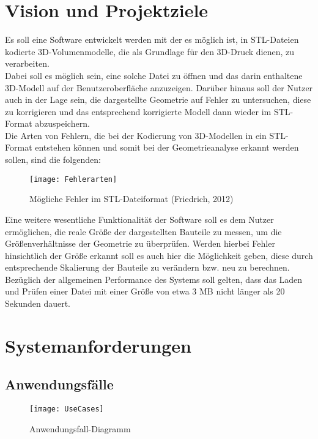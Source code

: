 \documentclass[fontsize=10pt, listof = totoc]{scrartcl}
\begin{document}
\section{Vision und Projektziele}
Es soll eine Software entwickelt werden mit der es möglich ist, in STL-Dateien kodierte 3D-Volumenmodelle, die als Grundlage für den 3D-Druck dienen, zu verarbeiten.\\

Dabei soll es möglich sein, eine solche Datei zu öffnen und das darin enthaltene 3D-Modell auf der Benutzeroberfläche anzuzeigen. Darüber hinaus soll der Nutzer auch in der Lage sein, die dargestellte Geometrie auf Fehler zu untersuchen, diese zu korrigieren und das entsprechend korrigierte Modell dann wieder im STL-Format abzuspeichern.\\

Die Arten von Fehlern, die bei der Kodierung von 3D-Modellen in ein STL-Format entstehen können und somit bei der Geometrieanalyse erkannt werden sollen, sind  die folgenden:

\begin{figure}[htpb]
\centering
\texttt{[image: Fehlerarten]}
\caption{Mögliche Fehler im STL-Dateiformat (Friedrich, 2012)}
\end{figure}

Eine weitere wesentliche Funktionalität der Software soll es dem Nutzer ermöglichen, die reale Größe der dargestellten Bauteile zu messen, um die Größenverhältnisse der Geometrie zu überprüfen. Werden hierbei Fehler hinsichtlich der Größe erkannt soll es auch hier die Möglichkeit geben, diese durch entsprechende Skalierung der Bauteile zu verändern bzw. neu zu berechnen.\\

Bezüglich der allgemeinen Performance des Systems soll gelten, dass das Laden und Prüfen einer Datei mit einer Größe von etwa 3 MB nicht länger als 20 Sekunden dauert.    
\newpage
\section{Systemanforderungen}
\subsection{Anwendungsfälle}
\begin{figure}[ht]
\centering
\texttt{[image: UseCases]}
\caption{Anwendungsfall-Diagramm}
\end{figure}\newpage
\end{document}
